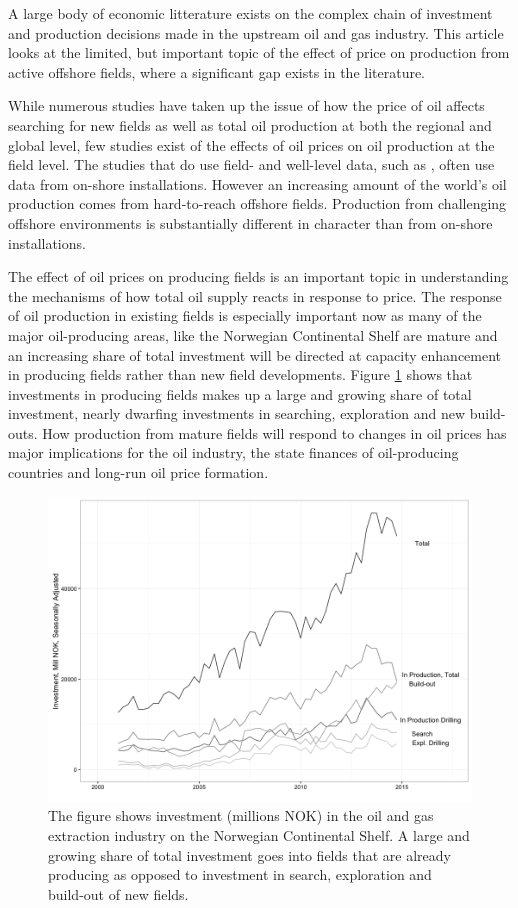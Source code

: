 \documentclass[12pt]{article}
\begin{document}
A large body of economic litterature exists on the complex chain of investment and production decisions made in the upstream oil and gas industry. This article looks at the limited, but important topic of the effect of price on production from active offshore fields, where a significant gap exists in the literature.  

While numerous studies have taken up the issue of how the price of oil affects searching for new fields as well as total oil production at both the regional and global level, few studies exist of the effects of oil prices on oil production at the field level.  The studies that do use field- and well-level data, such as \citet{rao_taxation_2010}, often use data from on-shore installations.  However an increasing amount of the world's oil production comes from hard-to-reach offshore fields.  Production from challenging offshore environments is substantially different in character than from on-shore installations.

The effect of oil prices on producing fields is an important topic in understanding the mechanisms of how total oil supply reacts in response to price. The response of oil production in existing fields is especially important now as many of the major oil-producing areas, like the Norwegian Continental Shelf are mature and an increasing share of total investment will be directed at capacity enhancement in producing fields rather than new field developments. Figure \ref{investment} shows that investments in producing fields makes up a large and growing share of total investment, nearly dwarfing investments in searching, exploration and new build-outs. How production from mature fields will respond to changes in oil prices has major implications for the oil industry, the state finances of oil-producing countries and long-run oil price formation.

\begin{figure}
	\center
	\includegraphics[width=.9\textwidth]{figures/investment.png}
	\caption{The figure shows investment (millions NOK) in the oil and gas extraction industry on the Norwegian Continental Shelf. A large and growing share of total investment goes into fields that are already producing as opposed to investment in search, exploration and build-out of new fields.}
	\label{investment}
\end{figure} 
\end{document}
